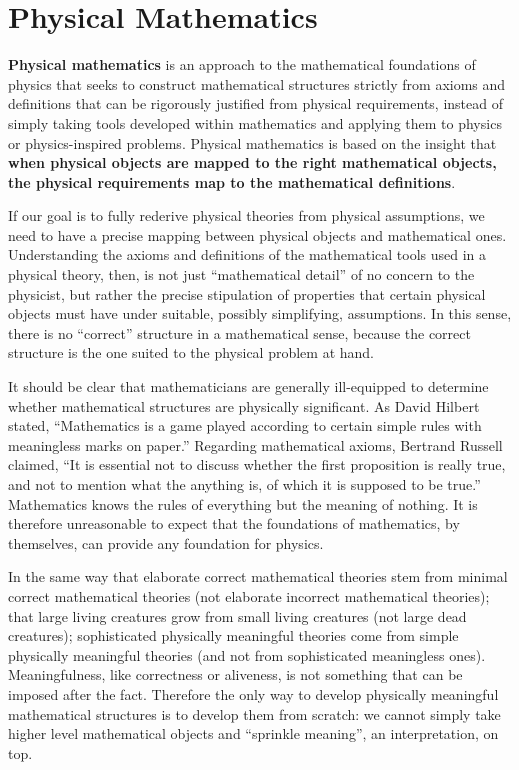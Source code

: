 \documentclass[11pt,letterpaper,fleqn]{memoir} %
\begin{document}
\part{Physical Mathematics}

\begingroup
\pagestyle{plain}


\textbf{Physical mathematics} is an approach to the mathematical foundations of physics that seeks to construct mathematical structures strictly from axioms and definitions that can be rigorously justified from physical requirements, instead of simply taking tools developed within mathematics and applying them to physics or physics-inspired problems. Physical mathematics is based on the insight that \textbf{when physical objects are mapped to the right mathematical objects, the physical requirements map to the mathematical definitions}.

If our goal is to fully rederive physical theories from physical assumptions, we need to have a precise mapping between physical objects and mathematical ones. Understanding the axioms and definitions of the mathematical tools used in a physical theory, then, is not just ``mathematical detail'' of no concern to the physicist, but rather the precise stipulation of properties that certain physical objects must have under suitable, possibly simplifying, assumptions. In this sense, there is no ``correct'' structure in a mathematical sense, because the correct structure is the one suited to the physical problem at hand.

It should be clear that mathematicians are generally ill-equipped to determine whether mathematical structures are physically significant. As David Hilbert stated, ``Mathematics is a game played according to certain simple rules with meaningless marks on paper.'' Regarding mathematical axioms, Bertrand Russell claimed, ``It is essential not to discuss whether the first proposition is really true, and not to mention what the anything is, of which it is supposed to be true.'' Mathematics knows the rules of everything but the meaning of nothing. It is therefore unreasonable to expect that the foundations of mathematics, by themselves, can provide any foundation for physics.

In the same way that elaborate correct mathematical theories stem from minimal correct mathematical theories (not elaborate incorrect mathematical theories); that large living creatures grow from small living creatures (not large dead creatures); sophisticated physically meaningful theories come from simple physically meaningful theories (and not from sophisticated meaningless ones). Meaningfulness, like correctness or aliveness, is not something that can be imposed after the fact. Therefore the only way to develop physically meaningful mathematical structures is to develop them from scratch: we cannot simply take higher level mathematical objects and ``sprinkle meaning'', an interpretation, on top.
\end{document}
